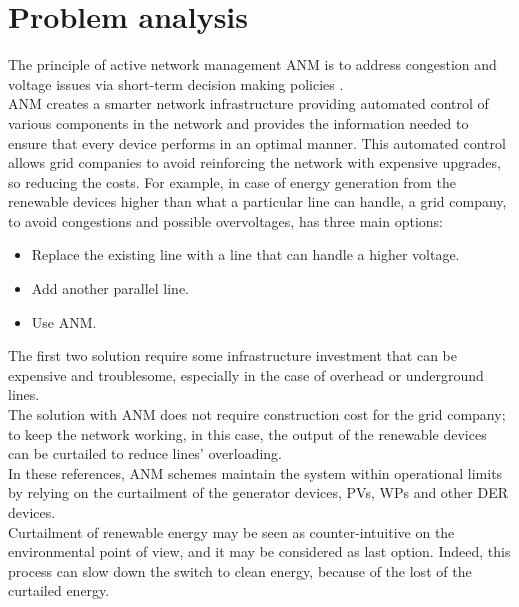 \chapter{Problem analysis}
\label{chapter4}
The principle of active network management \gls{ANM} is to address congestion and voltage issues via short-term decision making policies \cite{ANMQuentin}. \\
\gls{ANM} creates a smarter network infrastructure providing automated control of various components in the network and provides the information needed to ensure that every device performs in an optimal manner. This automated control allows grid companies to avoid reinforcing the network with expensive upgrades, so reducing the costs.
For example, in case of energy generation from the renewable devices higher than what a particular line can handle, a grid company, to avoid congestions and possible overvoltages, has three main options:
\begin{itemize}
    \item Replace the existing line with a line that can handle a higher voltage.
    \item Add another parallel line.
    \item Use \gls{ANM}.
\end{itemize}
The first two solution require some infrastructure investment that can be expensive and troublesome, especially in the case of overhead or underground lines.\\
The solution with \gls{ANM} does not require construction cost for the grid company; to keep the network working, in this case, the output of the renewable devices can be curtailed to reduce lines' overloading. \\

In these references, \gls{ANM} schemes maintain the system within operational limits by relying on the curtailment of the generator devices, \glspl{PV}, \glspl{WP} and other \gls{DER} devices. \\
Curtailment of renewable energy may be seen as counter-intuitive on the environmental point of view, and it may be considered as last option. Indeed, this process can slow down the switch to clean energy, because of the lost of the curtailed energy. \\

